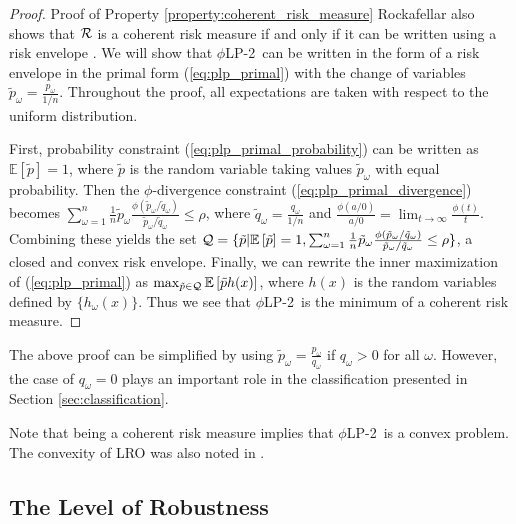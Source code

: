 \documentclass[opre,nonblindrev]{informs3} %
\newcommand{\E}{\mathbb{E}}
\newcommand{\e}[1]{\E \left[ #1 \right]}
\newcommand{\plp}{$\phi$LP-2}
\begin{document}
\bigskip 

\bigskip


\begin{proof}{\sc Proof of Property \ref{property:coherent_risk_measure}}
	Rockafellar also shows that $\cal R$ is a coherent risk measure if and only if it can be written using a risk envelope \citep{rockafellar2007coherent}.
	We will show that \plp\ can be written in the form of a risk envelope in the primal form (\ref{eq:plp_primal}) with the change of variables $\tilde{p}_\omega = \frac{p_\omega}{1/n}$.
	Throughout the proof, all expectations are taken with respect to the uniform distribution.
	
	First, probability constraint (\ref{eq:plp_primal_probability}) can be written as $\e{\tilde{p}} = 1$, where $\tilde{p}$ is the random variable taking values $\tilde{p}_\omega$ with equal probability.
	Then the $\phi$-divergence constraint (\ref{eq:plp_primal_divergence}) becomes $\sum_{\omega=1}^n \frac{1}{n} \tilde{p}_\omega \frac{\phi\left(\tilde{p}_\omega/\tilde{q}_\omega\right)}{\tilde{p}_\omega/\tilde{q}_\omega} \leq \rho$, where $\tilde{q}_\omega = \frac{q_\omega}{1/n}$ and $\frac{\phi(a/0)}{a/0} = \lim_{t \rightarrow \infty} \frac{\phi(t)}{t}$.
	Combining these yields the set ${\cal Q} = \{\tilde{p} | \e{\tilde{p}} = 1, \sum_{\omega=1}^n \frac{1}{n} \tilde{p}_\omega \frac{\phi\left(\tilde{p}_\omega/\tilde{q}_\omega\right)}{\tilde{p}_\omega/\tilde{q}_\omega} \leq \rho \}$, a closed and convex risk envelope.
	Finally, we can rewrite the inner maximization of (\ref{eq:plp_primal}) as $\max_{\tilde{p} \in {\cal Q}} \e{\tilde{p} h(x)}$, where $h(x)$ is the random variables defined by $\{h_\omega(x)\}$.
	Thus we see that \plp\ is the minimum of a coherent risk measure.
\end{proof}

\begin{remark}
	The above proof can be simplified by using $\tilde{p}_\omega = \frac{p_\omega}{q_\omega}$ if $q_\omega > 0$ for all $\omega$.
	However, the case of $q_\omega = 0$ plays an important role in the classification presented in Section \ref{sec:classification}.
\end{remark}

Note that being a coherent risk measure implies that \plp\ is a convex problem.
The convexity of LRO was also noted in \citep{wang2010likelihood}.


\subsection{The Level of Robustness}
\label{ssec:robust_level}
\end{document}
